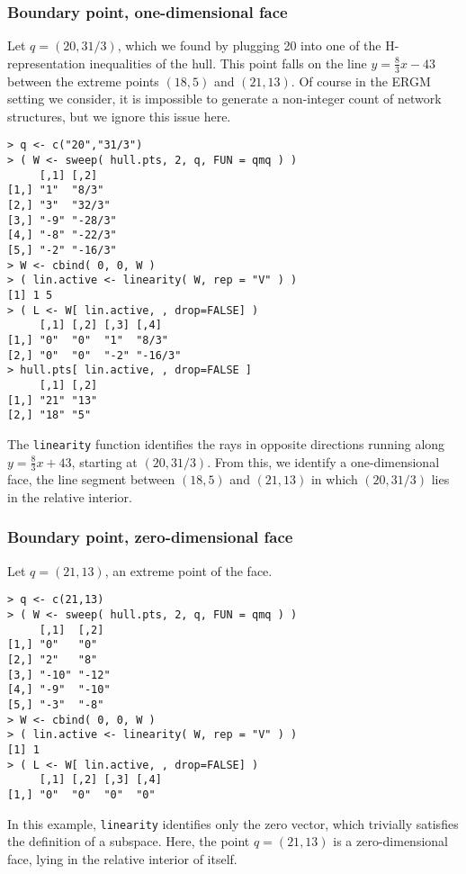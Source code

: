 \subsubsection{Boundary point, one-dimensional face}
Let $q = (20,31/3)$, which we found by plugging 20 into one of the H-representation
inequalities of the hull.  This point falls on the line $y = \frac{8}{3}x - 43$ between
the extreme points $(18,5)$ and $(21,13)$. Of course in the ERGM setting we consider,
it is impossible to generate a non-integer count of network structures,
but we ignore this issue here.
\begin{verbatim}
> q <- c("20","31/3")
> ( W <- sweep( hull.pts, 2, q, FUN = qmq ) )
     [,1] [,2]   
[1,] "1"  "8/3"  
[2,] "3"  "32/3" 
[3,] "-9" "-28/3"
[4,] "-8" "-22/3"
[5,] "-2" "-16/3"
> W <- cbind( 0, 0, W )
> ( lin.active <- linearity( W, rep = "V" ) )
[1] 1 5
> ( L <- W[ lin.active, , drop=FALSE] )
     [,1] [,2] [,3] [,4]   
[1,] "0"  "0"  "1"  "8/3"  
[2,] "0"  "0"  "-2" "-16/3"
> hull.pts[ lin.active, , drop=FALSE ]
     [,1] [,2]
[1,] "21" "13"
[2,] "18" "5" 
\end{verbatim}
The \texttt{linearity} function identifies the rays in opposite directions
running along $y = \frac{8}{3}x + 43$, starting at $(20,31/3)$.  From this, we
identify a one-dimensional face, the line segment between $(18,5)$ and $(21,13)$
in which $(20,31/3)$ lies in the relative interior.

\subsubsection{Boundary point, zero-dimensional face}
Let $q = (21,13)$, an extreme point of the face.
\begin{verbatim}
> q <- c(21,13)
> ( W <- sweep( hull.pts, 2, q, FUN = qmq ) )
     [,1]  [,2] 
[1,] "0"   "0"  
[2,] "2"   "8"  
[3,] "-10" "-12"
[4,] "-9"  "-10"
[5,] "-3"  "-8" 
> W <- cbind( 0, 0, W )
> ( lin.active <- linearity( W, rep = "V" ) )
[1] 1
> ( L <- W[ lin.active, , drop=FALSE] )
     [,1] [,2] [,3] [,4]
[1,] "0"  "0"  "0"  "0" 
\end{verbatim}
In this example, \texttt{linearity} identifies only the zero vector, which
trivially satisfies the definition of a subspace.  Here, the point $q = (21,13)$
is a zero-dimensional face, lying in the relative interior of itself.

